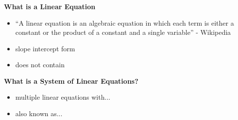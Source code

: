 \documentclass[fleqn]{beamer} %
\newcommand{\sectionIsubsectionItitle}{}
\newcommand{\sectionIsubsectionIItitle}{}
\begin{document}
			\begin{frame}
				\frametitle{\sectionIsubsectionItitle}
				\bigskip

				\textbf{What is a Linear Equation}

				\begin{itemize}
					\item ``A linear equation is an algebraic equation in which each term is either a constant or the product of a constant and a single variable'' - Wikipedia \vspace{3mm}\\
					\item slope intercept form	\vspace{3mm}\\
					\item does not contain \vspace{3mm}\\
				\end{itemize}	

				\textbf{ What is a System of Linear Equations?}
				\begin{itemize}
					\item multiple linear equations with... \vspace{3mm}\\
					\item also known as... \vspace{3mm}\\		
				\end{itemize}

				\btVFill
			\end{frame}

		\subsection{\sectionIsubsectionIItitle}\label{sectionIsubsectionII}
\end{document}
